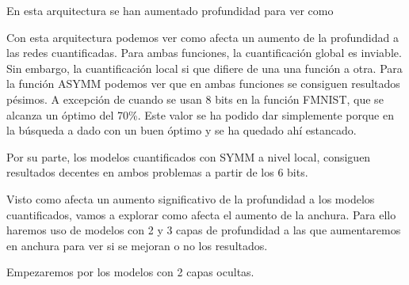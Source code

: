 En esta arquitectura se han aumentado profundidad para ver como

Con esta arquitectura podemos ver como afecta un aumento de la profundidad a las redes cuantificadas. Para ambas funciones, la cuantificación global es inviable. Sin embargo, la cuantificación local si que difiere de una una función a otra. Para la función ASYMM podemos ver que en ambas funciones se consiguen resultados pésimos. A excepción de cuando se usan 8 bits en la función FMNIST, que se alcanza un óptimo del 70\%. Este valor se ha podido dar simplemente porque en la búsqueda a dado con un buen óptimo y se ha quedado ahí estancado.  

Por su parte, los modelos cuantificados con SYMM a nivel local, consiguen resultados decentes en ambos problemas a partir de los 6 bits.

Visto como afecta un aumento significativo de la profundidad a los modelos cuantificados, vamos a explorar como afecta el aumento de la anchura. Para ello haremos uso de modelos con 2 y 3 capas de profundidad a las que aumentaremos en anchura para ver si se mejoran o no los resultados.

Empezaremos por los modelos con 2 capas ocultas.


